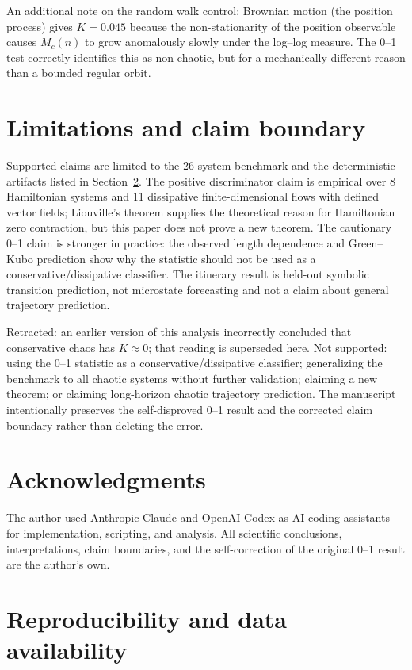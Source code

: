 \documentclass[11pt]{article}
\begin{document}
An additional note on the random walk control: Brownian motion (the position
process) gives $K=0.045$ because the non-stationarity of the position observable
causes $M_c(n)$ to grow anomalously slowly under the log--log measure. The 0--1
test correctly identifies this as non-chaotic, but for a mechanically different
reason than a bounded regular orbit.

\section{Limitations and claim boundary}

Supported claims are limited to the 26-system benchmark and the deterministic
artifacts listed in Section~\ref{sec:repro}. The positive discriminator claim is empirical over 8
Hamiltonian systems and 11 dissipative finite-dimensional flows with defined vector
fields; Liouville's theorem supplies the theoretical reason for Hamiltonian zero
contraction, but this paper does not prove a new theorem. The cautionary 0--1 claim
is stronger in practice: the observed length dependence and Green--Kubo prediction
show why the statistic should not be used as a conservative/dissipative classifier.
The itinerary result is held-out symbolic transition prediction, not microstate
forecasting and not a claim about general trajectory prediction.

Retracted: an earlier version of this analysis incorrectly concluded that
conservative chaos has $K\approx0$; that reading is superseded here.
Not supported: using the 0--1 statistic as a conservative/dissipative classifier;
generalizing the benchmark to all chaotic systems without further validation;
claiming a new theorem; or claiming long-horizon chaotic trajectory prediction.
The manuscript intentionally preserves the self-disproved 0--1 result and the
corrected claim boundary rather than deleting the error.

\section*{Acknowledgments}

The author used Anthropic Claude and OpenAI Codex as AI coding assistants for implementation, scripting, and analysis. All scientific conclusions, interpretations, claim boundaries, and the self-correction of the original 0--1 result are the author's own.

\section{Reproducibility and data availability}
\label{sec:repro}
\end{document}
